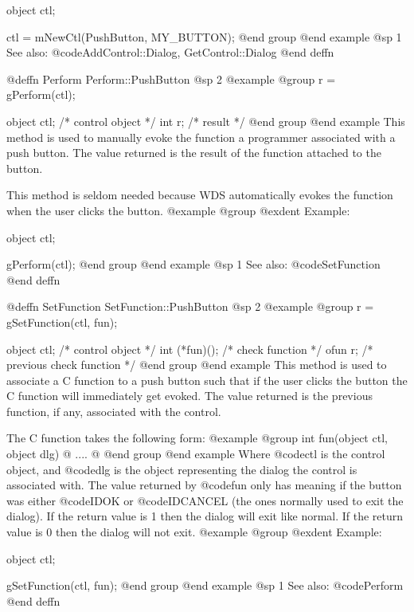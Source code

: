 object  ctl;

ctl = mNewCtl(PushButton, MY_BUTTON);
@end group
@end example
@sp 1
See also:  @code{AddControl::Dialog, GetControl::Dialog}
@end deffn









@deffn {Perform} Perform::PushButton
@sp 2
@example
@group
r = gPerform(ctl);

object  ctl;      /*  control object  */
int     r;        /*  result          */
@end group
@end example
This method is used to manually evoke the function a programmer associated 
with a push button.  The value returned is the result of the function
attached to the button.

This method is seldom needed because WDS automatically evokes the function
when the user clicks the button.
@example
@group
@exdent Example:

object  ctl;

gPerform(ctl);
@end group
@end example
@sp 1
See also:  @code{SetFunction}
@end deffn






@deffn {SetFunction} SetFunction::PushButton
@sp 2
@example
@group
r = gSetFunction(ctl, fun);

object  ctl;      /*  control object           */
int     (*fun)(); /*  check function           */
ofun    r;        /*  previous check function  */
@end group
@end example
This method is used to associate a C function to a push button such that
if the user clicks the button the C function will immediately get
evoked.  The value returned is the previous function, if any, associated
with the control.

The C function takes the following form:
@example
@group
int     fun(object ctl, object dlg)
@{
        ....
@}
@end group
@end example
Where @code{ctl} is the control object, and @code{dlg} is the object
representing the dialog the control is associated with.  The value
returned by @code{fun} only has meaning if the button was either
@code{IDOK} or @code{IDCANCEL} (the ones normally used to exit the
dialog).  If the return value is 1 then the dialog will exit like normal.
If the return value is 0 then the dialog will not exit.
@example
@group
@exdent Example:

object  ctl;

gSetFunction(ctl, fun);
@end group
@end example
@sp 1
See also:  @code{Perform}
@end deffn















